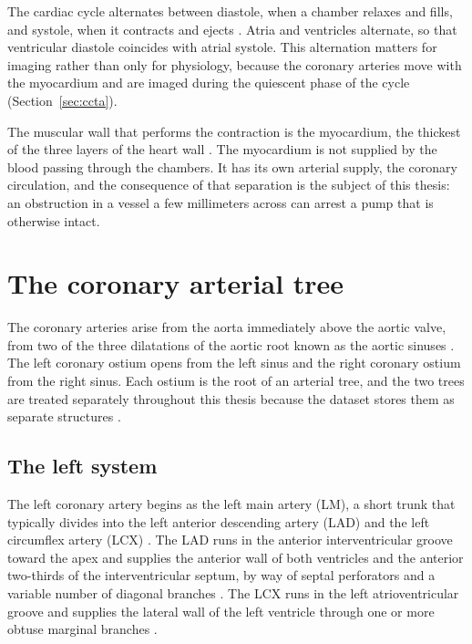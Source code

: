 The cardiac cycle alternates between diastole, when a chamber relaxes and fills, and systole,
when it contracts and ejects \cite{shah2009heart}.
Atria and ventricles alternate, so that ventricular diastole coincides with atrial systole.
This alternation matters for imaging rather than only for physiology, because the coronary
arteries move with the myocardium and are imaged during the quiescent phase of the cycle
(Section~\ref{sec:ccta}).

The muscular wall that performs the contraction is the myocardium, the thickest of the three
layers of the heart wall \cite{weinhaus2024anatomy}.
The myocardium is not supplied by the blood passing through the chambers.
It has its own arterial supply, the coronary circulation, and the consequence of that
separation is the subject of this thesis: an obstruction in a vessel a few millimeters across
can arrest a pump that is otherwise intact.

\section{The coronary arterial tree}
\label{sec:tree}

The coronary arteries arise from the aorta immediately above the aortic valve, from two of
the three dilatations of the aortic root known as the aortic sinuses
\cite{devos2024coronary}.
The left coronary ostium opens from the left sinus and the right coronary ostium from the
right sinus.
Each ostium is the root of an arterial tree, and the two trees are treated separately
throughout this thesis because the dataset stores them as separate structures
\cite{bransby2026imagecasx}.

\subsection{The left system}

The left coronary artery begins as the left main artery (LM), a short trunk that typically
divides into the left anterior descending artery (LAD) and the left circumflex artery (LCX)
\cite{devos2024coronary}.
The LAD runs in the anterior interventricular groove toward the apex and supplies the
anterior wall of both ventricles and the anterior two-thirds of the interventricular septum,
by way of septal perforators and a variable number of diagonal branches
\cite{devos2024coronary,obrien2007anatomy}.
The LCX runs in the left atrioventricular groove and supplies the lateral wall of the left
ventricle through one or more obtuse marginal branches \cite{devos2024coronary}.

